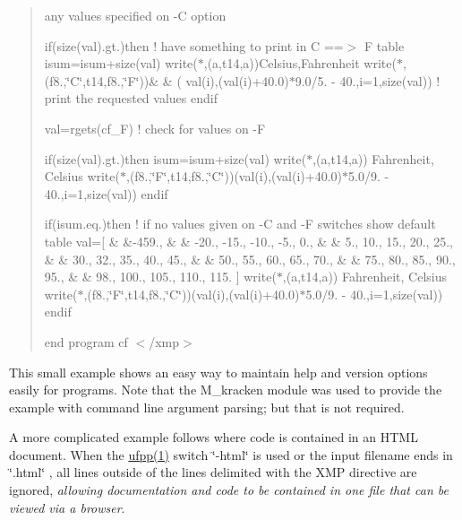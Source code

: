 \begin{quote}
any values specified on -\/C option

if(size(val).gt.)then ! have something to print in C ==$>$ F table isum=isum+size(val) write($\ast$,\textquotesingle{}(a,t14,a)\textquotesingle{})\textquotesingle{}Celsius\textquotesingle{},\textquotesingle{}Fahrenheit\textquotesingle{} write($\ast$,\textquotesingle{}(f8.,\char`\"{}\+C\char`\"{},t14,f8.,\char`\"{}\+F\char`\"{})\textquotesingle{})\& \& ( val(i),(val(i)+40.0)$\ast$9.0/5. -\/ 40.,i=1,size(val)) ! print the requested values endif

val=rgets(\textquotesingle{}cf\+\_\+F\textquotesingle{}) ! check for values on -\/F

if(size(val).gt.)then isum=isum+size(val) write($\ast$,\textquotesingle{}(a,t14,a)\textquotesingle{}) \textquotesingle{}Fahrenheit\textquotesingle{}, \textquotesingle{}Celsius\textquotesingle{} write($\ast$,\textquotesingle{}(f8.,\char`\"{}\+F\char`\"{},t14,f8.,\char`\"{}\+C\char`\"{})\textquotesingle{})(val(i),(val(i)+40.0)$\ast$5.0/9. -\/ 40.,i=1,size(val)) endif

if(isum.\+eq.)then ! if no values given on -\/C and -\/F switches show default table val=\mbox{[} \& \&-\/459., \& \& -\/20., -\/15., -\/10., -\/5., 0., \& \& 5., 10., 15., 20., 25., \& \& 30., 32., 35., 40., 45., \& \& 50., 55., 60., 65., 70., \& \& 75., 80., 85., 90., 95., \& \& 98., 100., 105., 110., 115. \mbox{]} write($\ast$,\textquotesingle{}(a,t14,a)\textquotesingle{}) \textquotesingle{}Fahrenheit\textquotesingle{}, \textquotesingle{}Celsius\textquotesingle{} write($\ast$,\textquotesingle{}(f8.,\char`\"{}\+F\char`\"{},t14,f8.,\char`\"{}\+C\char`\"{})\textquotesingle{})(val(i),(val(i)+40.0)$\ast$5.0/9. -\/ 40.,i=1,size(val)) endif

end program cf $<$/xmp$>$ \end{quote}


This small example shows an easy way to maintain help and version options easily for programs. Note that the M\+\_\+kracken module was used to provide the example with command line argument parsing; but that is not required. 

A more complicated example follows where code is contained in an H\+T\+ML document. When the \hyperlink{ufpp__overview_81_8txt_a97c20a96bcab81bc74c9d64b001f1202}{ufpp(1)} switch \char`\"{}-\/html\char`\"{} is used or the input filename ends in \char`\"{}.\+html\char`\"{} , all lines outside of the lines delimited with the X\+MP directive are ignored, {\itshape allowing documentation and code to be contained in one file that can be viewed via a browser}. 


